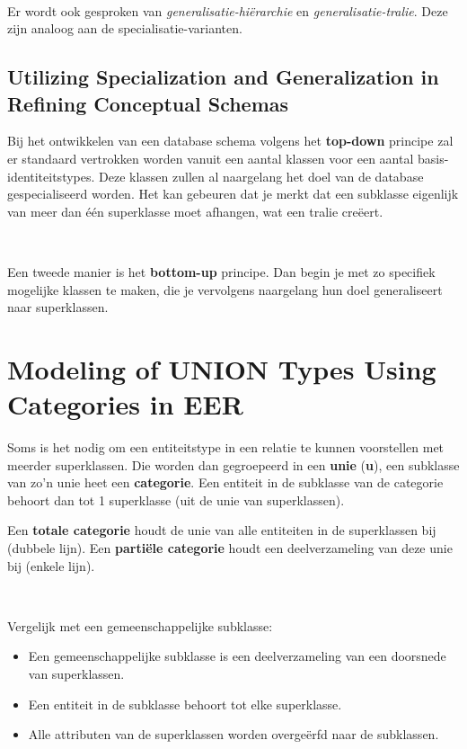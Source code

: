 ~

\noindent Er wordt ook gesproken van \textit{generalisatie-hi\"erarchie} en \textit{generalisatie-tralie}. Deze zijn analoog aan de specialisatie-varianten.

\subsection{Utilizing Specialization and Generalization in Refining Conceptual Schemas}
Bij het ontwikkelen van een database schema volgens het \textbf{top-down} principe zal er standaard vertrokken worden vanuit een aantal klassen voor een aantal basis-identiteitstypes. Deze klassen zullen al naargelang het doel van de database gespecialiseerd worden. Het kan gebeuren dat je merkt dat een subklasse eigenlijk van meer dan \'e\'en superklasse moet afhangen, wat een tralie cre\"eert.

~

\noindent Een tweede manier is het \textbf{bottom-up} principe. Dan begin je met zo specifiek mogelijke klassen te maken, die je vervolgens naargelang hun doel generaliseert naar superklassen.


\section{Modeling of UNION Types Using Categories in EER}
Soms is het nodig om een entiteitstype in een relatie te kunnen voorstellen met meerder superklassen. Die worden dan gegroepeerd in een \textbf{unie} (\textbf{u}), een subklasse van zo'n unie heet een \textbf{categorie}. Een entiteit in de subklasse van de categorie behoort dan tot 1 superklasse (uit de unie van superklassen).

Een \textbf{totale categorie} houdt de unie van alle entiteiten in de superklassen bij (dubbele lijn). Een \textbf{parti\"ele categorie} houdt een deelverzameling van deze unie bij (enkele lijn).

~

\noindent Vergelijk met een gemeenschappelijke subklasse:
\begin{itemize}
\item Een gemeenschappelijke subklasse is een deelverzameling van een doorsnede van superklassen.
\item Een entiteit in de subklasse behoort tot elke superklasse.
\item Alle attributen van de superklassen worden overge\"erfd naar de subklassen.
\end{itemize}


